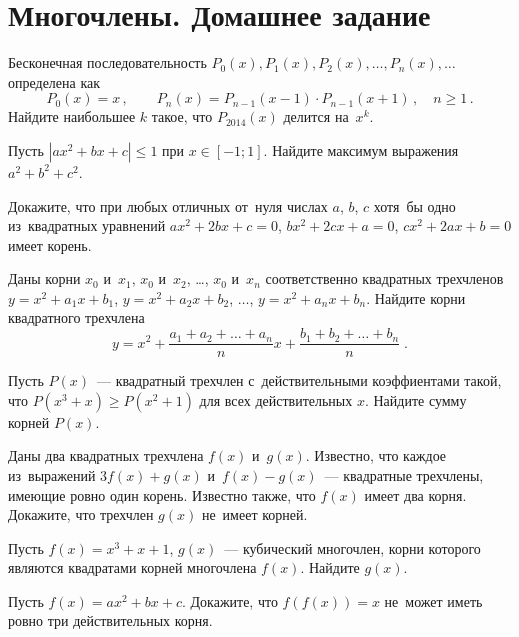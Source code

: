 

\section*{Многочлены. Домашнее задание}


\begin{problems}

\item
Бесконечная последовательность
$P_0(x), P_1(x), P_2(x), \ldots, P_n(x), \ldots$
определена как
\[
    P_0(x) = x
\, , \qquad
    P_n(x) = P_{n-1}(x - 1) \cdot P_{n-1}(x + 1)
\, , \quad
    n \geq 1
\, . \]
Найдите наибольшее $k$ такое, что $P_{2014}(x)$ делится на~$x^k$.

\item
Пусть $|a x^2 + b x + c| \leq 1$ при $x \in [-1; 1]$.
Найдите максимум выражения $a^2 + b^2 + c^2$.

\item
Докажите, что при любых отличных от~нуля числах $a$, $b$, $c$ хотя~бы одно
из~квадратных уравнений
$a x^2 + 2 b x + c = 0$, $b x^2 + 2 c x + a = 0$, $c x^2 + 2 a x + b = 0$
имеет корень.

\item
Даны корни $x_0$ и~$x_1$, $x_0$ и~$x_2$, \ldots, $x_0$ и~$x_n$ соответственно
квадратных трехчленов
$y = x^2 + a_1 x + b_1$, $y = x^2 + a_2 x + b_2$, $\ldots$,
$y = x^2 + a_n x + b_n$.
Найдите корни квадратного трехчлена
\[
    y
=
    x^2 +
    \frac{a_1 + a_2 + \ldots + a_n}{n} x +
    \frac{b_1 + b_2 + \ldots + b_n}{n}
\; . \]

\item
Пусть $P(x)$~--- квадратный трехчлен с~действительными коэффиентами такой, что
$P(x^3 + x) \geq P(x^2 + 1)$ для всех действительных $x$.
Найдите сумму корней $P(x)$.

\item
Даны два квадратных трехчлена $f(x)$ и~$g(x)$.
Известно, что каждое из~выражений $3 f(x) + g(x)$ и~$f(x) - g(x)$~---
квадратные трехчлены, имеющие ровно один корень.
Известно также, что $f(x)$ имеет два корня.
Докажите, что трехчлен $g(x)$ не~имеет корней.

\item
Пусть $f(x) = x^3 + x + 1$, $g(x)$~--- кубический многочлен, корни которого
являются квадратами корней многочлена $f(x)$.
Найдите $g(x)$.

\item
Пусть $f(x) = a x^2 + b x + c$.
Докажите, что $f(f(x)) = x$ не~может иметь ровно три действительных корня.

\end{problems}


